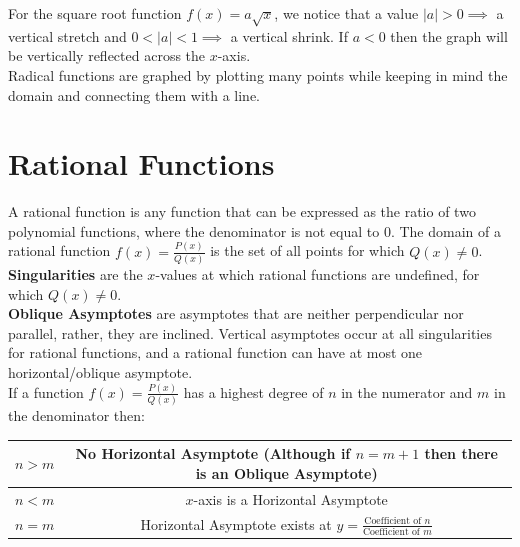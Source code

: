 \documentclass{article}
\begin{document}
    \noindent For the square root function $f(x)=a\sqrt{x}$, we notice that a value
    $|a|>0\implies$ a vertical stretch and $0<|a|<1\implies$ a vertical shrink. If $a<0$ then
    the graph will be vertically reflected across the $x$-axis. \\

    \noindent Radical functions are graphed by plotting many points while keeping in mind the
    domain and connecting them with a line.

    \pagebreak


    \section{Rational Functions}

    A rational function is any function that can be expressed as the ratio of two polynomial
    functions, where the denominator is not equal to 0. The domain of a rational function
    $f(x)=\frac{P(x)}{Q(x)}$ is the set of all points for which $Q(x)\not=0$.
    \textbf{Singularities} are the $x$-values at which rational functions are undefined, for
    which $Q(x)\not=0$. \\

    \noindent \textbf{Oblique Asymptotes} are asymptotes that are neither perpendicular nor
    parallel, rather, they are inclined. Vertical asymptotes occur at all singularities for
    rational functions, and a rational function can have at most one horizontal/oblique asymptote. \\

    \noindent If a function $f(x)=\frac{P(x)}{Q(x)}$ has a highest degree of $n$ in the numerator
    and $m$ in the denominator then: \\

    \begin{center}
        \begin{tabular}{|c|c|}
            \hline
            $n>m$ & No Horizontal Asymptote (Although if $n=m+1$ then there is an Oblique Asymptote)            \\
            \hline
            $n<m$ & $x$-axis is a Horizontal Asymptote                                                          \\
            \hline
            $n=m$ & Horizontal Asymptote exists at $y=\frac{\text{Coefficient of }        n}{\text{Coefficient of } m}$ \\
            \hline
        \end{tabular}
    \end{center}
\end{document}
